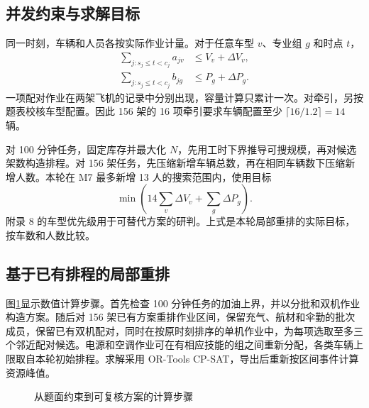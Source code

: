 \documentclass[UTF8,12pt,a4paper,fontset=none]{ctexart}
\newcommand{\sectionpage}{\clearpage}
\begin{document}
\sectionpage
\subsection{并发约束与求解目标}
同一时刻，车辆和人员各按实际作业计量。对于任意车型 $v$、专业组 $g$ 和时点 $t$，
\begin{align}
\sum_{j: s_j\le t<c_j} a_{jv} &\le V_v+\Delta V_v,\\
\sum_{j: s_j\le t<c_j} b_{jg} &\le P_g+\Delta P_g.
\end{align}
一项配对作业在两架飞机的记录中分别出现，容量计算只累计一次。对牵引，另按题表校核车型配置。因此 156 架的 16 项牵引要求车辆配置至少 $\lceil 16/1.2\rceil=14$ 辆。
\par 对 100 分钟任务，固定库存并最大化 $N$，先用工时下界推导可搜规模，再对候选架数构造排程。对 156 架任务，先压缩新增车辆总数，再在相同车辆数下压缩新增人数。本轮在 M7 最多新增 13 人的搜索范围内，使用目标
\begin{equation}
\min\left(14\sum_v \Delta V_v+\sum_g\Delta P_g\right).
\end{equation}
附录 8 的车型优先级用于可替代方案的研判。上式是本轮局部重排的实际目标，按车数和人数比较。

\subsection{基于已有排程的局部重排}
图\ref{fig:q1-method}显示数值计算步骤。首先检查 100 分钟任务的加油上界，并以分批和双机作业构造方案。随后对 156 架已有方案重排作业区间，保留充气、航材和伞勤的批次成员，保留已有双机配对，同时在按原时刻排序的单机作业中，为每项选取至多三个邻近配对候选。电源和空调作业可在有相应技能的组之间重新分配，各类车辆上限取自本轮初始排程。求解采用 OR-Tools CP-SAT，导出后重新按区间事件计算资源峰值。
\begin{figure}[ht]
\centering
{}
\caption{从题面约束到可复核方案的计算步骤}
\label{fig:q1-method}
\end{figure}
\end{document}
